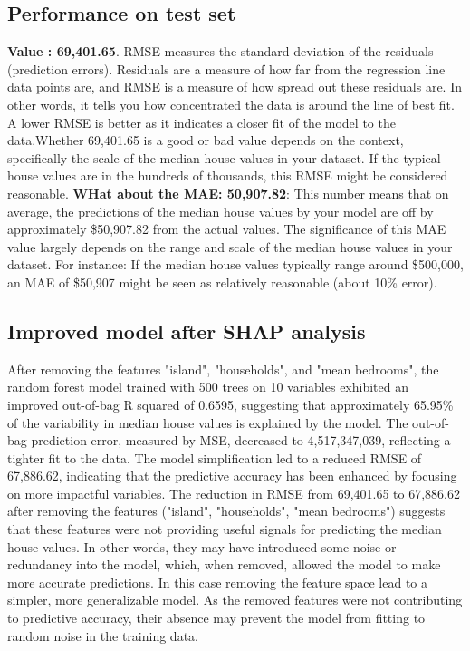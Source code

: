 \documentclass[12pt]{article}
\begin{document}
\subsection{Performance on test set}
\textbf{Value : 69,401.65}. RMSE measures the standard deviation of the residuals (prediction errors). Residuals are a measure of how far from the regression line data points are, and RMSE is a measure of how spread out these residuals are. In other words, it tells you how concentrated the data is around the line of best fit. A lower RMSE is better as it indicates a closer fit of the model to the data.Whether 69,401.65 is a good or bad value depends on the context, specifically the scale of the median house values in your dataset. If the typical house values are in the hundreds of thousands, this RMSE might be considered reasonable. 
\textbf{WHat about the MAE: 50,907.82}: This number means that on average, the predictions of the median house values by your model are off by approximately \$50,907.82 from the actual values. The significance of this MAE value largely depends on the range and scale of the median house values in your dataset. For instance:
If the median house values typically range around \$500,000, an MAE of \$50,907 might be seen as relatively reasonable (about 10\% error).

\subsection{Improved model after SHAP analysis}
After removing the features "island", "households", and "mean bedrooms", the random forest model trained with 500 trees on 10 variables exhibited an improved out-of-bag R squared of 0.6595, suggesting that approximately 65.95\% of the variability in median house values is explained by the model. The out-of-bag prediction error, measured by MSE, decreased to 4,517,347,039, reflecting a tighter fit to the data. The model simplification led to a reduced RMSE of 67,886.62, indicating that the predictive accuracy has been enhanced by focusing on more impactful variables.
The reduction in RMSE from 69,401.65 to 67,886.62 after removing the features ("island", "households", "mean bedrooms") suggests that these features were not providing useful signals for predicting the median house values. In other words, they may have introduced some noise or redundancy into the model, which, when removed, allowed the model to make more accurate predictions. In this case removing the feature space lead to a simpler, more generalizable model. As the removed features were not contributing to predictive accuracy, their absence may prevent the model from fitting to random noise in the training data.
\end{document}
